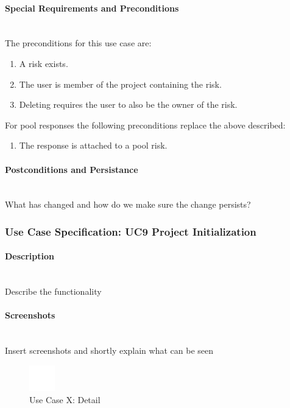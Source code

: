 \paragraph*{Special Requirements and Preconditions}\mbox{}\\
The preconditions for this use case are:
\begin{enumerate}
	\vspace{-3mm}
	\setlength\itemsep{-1em}
	\item  A risk exists.
	\item The user is member of the project containing the risk.
	\item Deleting requires the user to also be the owner of the risk.
\end{enumerate}
For pool responses the following preconditions replace the above described:
\begin{enumerate}
	\vspace{-3mm}
	\setlength\itemsep{-1em}
	\item The response is attached to a pool risk.
\end{enumerate}

\paragraph*{Postconditions and Persistance}\mbox{}\\
What has changed and how do we make sure the change persists?

\newpage
\subsubsection{Use Case Specification: \ac{UC}9 Project Initialization}
\label{sec:domainBbj}

\paragraph*{Description}\mbox{}\\
Describe the functionality

\paragraph*{Screenshots}\mbox{}\\
Insert screenshots and shortly explain what can be seen
\begin{figure}[h] 
	\centering
	\includegraphics[width=0.1\textwidth]{Content/Domain/placeholder.png}
	\caption{Use Case X: Detail}
	\label{fig:label9}
\end{figure}

